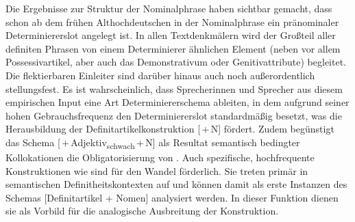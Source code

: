 Die Ergebnisse zur Struktur der Nominalphrase haben sichtbar gemacht, dass schon ab dem frühen Althochdeutschen in der Nominalphrase ein pränominaler Determiniererslot angelegt ist. In allen Textdenkmälern wird der Großteil aller definiten Phrasen von einem Determinierer ähnlichen Element (neben  vor allem Possessivartikel, aber auch das Demonstrativum  oder Genitivattribute) begleitet. Die flektierbaren Einleiter sind darüber hinaus auch noch außerordentlich stellungsfest. Es ist wahrscheinlich, dass Sprecherinnen und Sprecher aus diesem empirischen Input eine Art Determiniererschema ableiten, in dem  aufgrund seiner hohen Gebrauchsfrequenz den Determiniererslot standardmäßig besetzt, was die Herausbildung der Definitartikelkonstruktion [\,+\,N] fördert. Zudem begünstigt das Schema [\,+\,Adjektiv\textsubscript{schwach}\,+\,N] als Resultat semantisch bedingter Kollokationen die Obligatorisierung von . Auch spezifische, hochfrequente Konstruktionen wie  sind für den Wandel förderlich. Sie treten primär in semantischen Definitheitskontexten auf und können damit als erste Instanzen des Schemas [Definitartikel + Nomen] analysiert werden. In dieser Funktion dienen sie als Vorbild für die analogische Ausbreitung der Konstruktion. 






